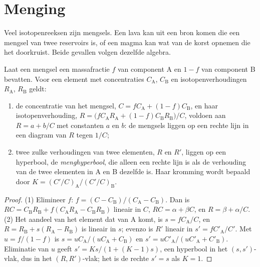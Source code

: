 \section{Menging}

Veel isotopenreeksen zijn mengsels. Een lava kan uit een bron komen die een
mengsel van twee reservoirs is, of een magma kan wat van de korst opnemen die het doorkruist.
Beide gevallen volgen dezelfde algebra.

\begin{proposition}[Menghyperbool]\label{prop:b2:isotope-geochemistry:mixing}
Laat een mengsel een massafractie $f$ van component A en $1-f$ van component
B bevatten. Voor een element met concentraties $C_{\mathrm A}$, $C_{\mathrm B}$ en isotopenverhoudingen
$R_{\mathrm A}$, $R_{\mathrm B}$ geldt:
\begin{enumerate}
\item de concentratie van het mengsel, $C = fC_{\mathrm A} + (1-f)C_{\mathrm B}$, en
haar isotopenverhouding,
$R = \bigl(fC_{\mathrm A}R_{\mathrm A} + (1-f)C_{\mathrm B}R_{\mathrm B}\bigr)/C$, voldoen aan
$R = a + b/C$ met constanten $a$ en $b$: de mengsels liggen op een rechte lijn in
een diagram van $R$ tegen $1/C$;
\item twee zulke verhoudingen van twee elementen, $R$ en $R'$, liggen op een hyperbool, de
\emph{menghyperbool}, die alleen een rechte lijn is
als de verhouding van de twee elementen in A en B dezelfde is. Haar kromming wordt bepaald door
$K = (C'/C)_{\mathrm A}/(C'/C)_{\mathrm B}$.
\end{enumerate}
\end{proposition}

\begin{proof}
(1) Elimineer $f$: $f = (C - C_{\mathrm B})/(C_{\mathrm A} - C_{\mathrm B})$. Dan is
$RC = C_{\mathrm B}R_{\mathrm B} + f(C_{\mathrm A}R_{\mathrm A} - C_{\mathrm B}R_{\mathrm
B})$ lineair in $C$, $RC = \alpha + \beta C$, en $R = \beta + \alpha/C$.
(2) Het aandeel van het element dat van A komt, is $s = fC_{\mathrm A}/C$, en $R =
R_{\mathrm B} + s(R_{\mathrm A} - R_{\mathrm B})$ is lineair in $s$; evenzo is $R'$
lineair in $s' = fC'_{\mathrm A}/C'$. Met $u = f/(1-f)$ is $s = u C_{\mathrm
A}/(uC_{\mathrm A} + C_{\mathrm B})$ en $s' = uC'_{\mathrm A}/(uC'_{\mathrm A} +
C'_{\mathrm B})$. Eliminatie van $u$ geeft $s' = Ks/(1 + (K-1)s)$, een hyperbool in het
$(s, s')$-vlak, dus in het $(R, R')$-vlak; het is de rechte $s' = s$
als $K = 1$.
\end{proof}

